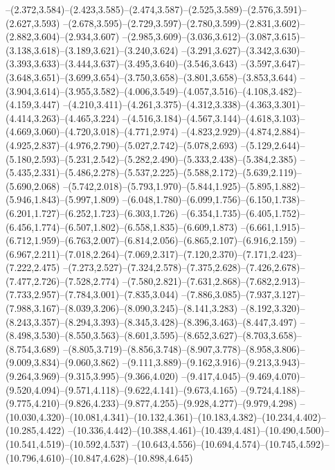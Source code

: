   --(2.372,3.584)--(2.423,3.585)--(2.474,3.587)--(2.525,3.589)--(2.576,3.591)--(2.627,3.593)%
  --(2.678,3.595)--(2.729,3.597)--(2.780,3.599)--(2.831,3.602)--(2.882,3.604)--(2.934,3.607)%
  --(2.985,3.609)--(3.036,3.612)--(3.087,3.615)--(3.138,3.618)--(3.189,3.621)--(3.240,3.624)%
  --(3.291,3.627)--(3.342,3.630)--(3.393,3.633)--(3.444,3.637)--(3.495,3.640)--(3.546,3.643)%
  --(3.597,3.647)--(3.648,3.651)--(3.699,3.654)--(3.750,3.658)--(3.801,3.658)--(3.853,3.644)%
  --(3.904,3.614)--(3.955,3.582)--(4.006,3.549)--(4.057,3.516)--(4.108,3.482)--(4.159,3.447)%
  --(4.210,3.411)--(4.261,3.375)--(4.312,3.338)--(4.363,3.301)--(4.414,3.263)--(4.465,3.224)%
  --(4.516,3.184)--(4.567,3.144)--(4.618,3.103)--(4.669,3.060)--(4.720,3.018)--(4.771,2.974)%
  --(4.823,2.929)--(4.874,2.884)--(4.925,2.837)--(4.976,2.790)--(5.027,2.742)--(5.078,2.693)%
  --(5.129,2.644)--(5.180,2.593)--(5.231,2.542)--(5.282,2.490)--(5.333,2.438)--(5.384,2.385)%
  --(5.435,2.331)--(5.486,2.278)--(5.537,2.225)--(5.588,2.172)--(5.639,2.119)--(5.690,2.068)%
  --(5.742,2.018)--(5.793,1.970)--(5.844,1.925)--(5.895,1.882)--(5.946,1.843)--(5.997,1.809)%
  --(6.048,1.780)--(6.099,1.756)--(6.150,1.738)--(6.201,1.727)--(6.252,1.723)--(6.303,1.726)%
  --(6.354,1.735)--(6.405,1.752)--(6.456,1.774)--(6.507,1.802)--(6.558,1.835)--(6.609,1.873)%
  --(6.661,1.915)--(6.712,1.959)--(6.763,2.007)--(6.814,2.056)--(6.865,2.107)--(6.916,2.159)%
  --(6.967,2.211)--(7.018,2.264)--(7.069,2.317)--(7.120,2.370)--(7.171,2.423)--(7.222,2.475)%
  --(7.273,2.527)--(7.324,2.578)--(7.375,2.628)--(7.426,2.678)--(7.477,2.726)--(7.528,2.774)%
  --(7.580,2.821)--(7.631,2.868)--(7.682,2.913)--(7.733,2.957)--(7.784,3.001)--(7.835,3.044)%
  --(7.886,3.085)--(7.937,3.127)--(7.988,3.167)--(8.039,3.206)--(8.090,3.245)--(8.141,3.283)%
  --(8.192,3.320)--(8.243,3.357)--(8.294,3.393)--(8.345,3.428)--(8.396,3.463)--(8.447,3.497)%
  --(8.498,3.530)--(8.550,3.563)--(8.601,3.595)--(8.652,3.627)--(8.703,3.658)--(8.754,3.689)%
  --(8.805,3.719)--(8.856,3.748)--(8.907,3.778)--(8.958,3.806)--(9.009,3.834)--(9.060,3.862)%
  --(9.111,3.889)--(9.162,3.916)--(9.213,3.943)--(9.264,3.969)--(9.315,3.995)--(9.366,4.020)%
  --(9.417,4.045)--(9.469,4.070)--(9.520,4.094)--(9.571,4.118)--(9.622,4.141)--(9.673,4.165)%
  --(9.724,4.188)--(9.775,4.210)--(9.826,4.233)--(9.877,4.255)--(9.928,4.277)--(9.979,4.298)%
  --(10.030,4.320)--(10.081,4.341)--(10.132,4.361)--(10.183,4.382)--(10.234,4.402)--(10.285,4.422)%
  --(10.336,4.442)--(10.388,4.461)--(10.439,4.481)--(10.490,4.500)--(10.541,4.519)--(10.592,4.537)%
  --(10.643,4.556)--(10.694,4.574)--(10.745,4.592)--(10.796,4.610)--(10.847,4.628)--(10.898,4.645)%

